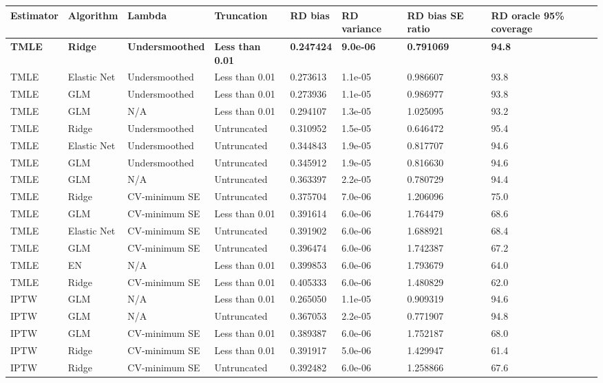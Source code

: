 
\begin{longtable}[l]{llllllll}
\toprule
Estimator & Algorithm & Lambda & Truncation & RD bias & RD variance & RD bias SE ratio & RD oracle 95\% coverage\\
\midrule
\midrule
\textbf{TMLE} & \textbf{Ridge} & \textbf{Undersmoothed} & \textbf{Less than 0.01} & \textbf{0.247424} & \textbf{9.0e-06} & \textbf{0.791069} & \textbf{94.8}\\
\midrule
TMLE & Elastic Net & Undersmoothed & Less than 0.01 & 0.273613 & 1.1e-05 & 0.986607 & 93.8\\
TMLE & GLM & Undersmoothed & Less than 0.01 & 0.273936 & 1.1e-05 & 0.986977 & 93.8\\
TMLE & GLM & N/A & Less than 0.01 & 0.294107 & 1.3e-05 & 1.025095 & 93.2\\
TMLE & Ridge & Undersmoothed & Untruncated & 0.310952 & 1.5e-05 & 0.646472 & 95.4\\
TMLE & Elastic Net & Undersmoothed & Untruncated & 0.344843 & 1.9e-05 & 0.817707 & 94.6\\
TMLE & GLM & Undersmoothed & Untruncated & 0.345912 & 1.9e-05 & 0.816630 & 94.6\\
TMLE & GLM & N/A & Untruncated & 0.363397 & 2.2e-05 & 0.780729 & 94.4\\
TMLE & Ridge & CV-minimum SE & Untruncated & 0.375704 & 7.0e-06 & 1.206096 & 75.0\\
TMLE & GLM & CV-minimum SE & Less than 0.01 & 0.391614 & 6.0e-06 & 1.764479 & 68.6\\
TMLE & Elastic Net & CV-minimum SE & Untruncated & 0.391902 & 6.0e-06 & 1.688921 & 68.4\\
TMLE & GLM & CV-minimum SE & Untruncated & 0.396474 & 6.0e-06 & 1.742387 & 67.2\\
TMLE & EN & N/A & Less than 0.01 & 0.399853 & 6.0e-06 & 1.793679 & 64.0\\
TMLE & Ridge & CV-minimum SE & Less than 0.01 & 0.405333 & 6.0e-06 & 1.480829 & 62.0\\
IPTW & GLM & N/A & Less than 0.01 & 0.265050 & 1.1e-05 & 0.909319 & 94.6\\
IPTW & GLM & N/A & Untruncated & 0.367053 & 2.2e-05 & 0.771907 & 94.8\\
IPTW & GLM & CV-minimum SE & Less than 0.01 & 0.389387 & 6.0e-06 & 1.752187 & 68.0\\
IPTW & Ridge & CV-minimum SE & Less than 0.01 & 0.391917 & 5.0e-06 & 1.429947 & 61.4\\
IPTW & Ridge & CV-minimum SE & Untruncated & 0.392482 & 6.0e-06 & 1.258866 & 67.6\\

\end{longtable}
